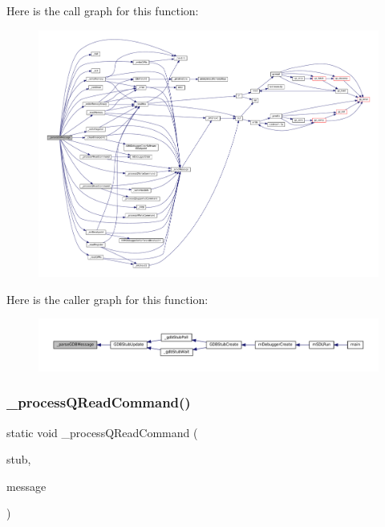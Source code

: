 Here is the call graph for this function\+:
\nopagebreak
\begin{figure}[H]
\begin{center}
\leavevmode
\includegraphics[width=350pt]{gdb-stub_8c_ac8630a52d935a21513afd3f0d14ffe90_cgraph}
\end{center}
\end{figure}
Here is the caller graph for this function\+:
\nopagebreak
\begin{figure}[H]
\begin{center}
\leavevmode
\includegraphics[width=350pt]{gdb-stub_8c_ac8630a52d935a21513afd3f0d14ffe90_icgraph}
\end{center}
\end{figure}
\mbox{\label{gdb-stub_8c_ab15c73fbee09b784e5989c520d65c002}} 
\subsubsection{\texorpdfstring{\+\_\+process\+Q\+Read\+Command()}{\_processQReadCommand()}}
{\footnotesize\ttfamily static void \+\_\+process\+Q\+Read\+Command (\begin{DoxyParamCaption}\item[{struct G\+D\+B\+Stub $\ast$}]{stub,  }\item[{const char $\ast$}]{message }\end{DoxyParamCaption})\hspace{0.3cm}{\ttfamily [static]}}


